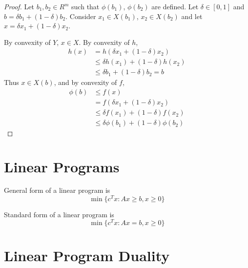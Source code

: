 \begin{proof}
  Let $b_{1}, b_{2} \in R^{m}$ such that $\phi(b_{1})$, $\phi(b_{2})$
  are defined.  Let $\delta \in [0, 1]$ and $b = \delta b_{1} + (1 -
  \delta) b_{2}$.  Consider $x_{1} \in X(b_{1})$, $x_{2} \in X(b_{2})$
  and let $x = \delta x_{1} + (1 - \delta) x_{2}$.

  By convexity of $Y$, $x \in X$.  By convexity of $h$,
  \begin{align*}
    h(x)    & = h(\delta x_{1} + (1-\delta) x_{2})         \\
            & \leq \delta h(x_{1}) + (1-\delta) h(x_{2})   \\
            & \leq \delta b_{1} + (1 - \delta) b_{2} = b
  \end{align*}
  Thus $x \in X(b)$, and by convexity of $f$,
  \begin{align*}
    \phi(b) & \leq f(x)                                    \\
            & = f(\delta x_{1} + (1 - \delta) x_{2})       \\
            & \leq \delta f(x_{1}) + (1 - \delta) f(x_{2}) \\
            & \leq \delta \phi(b_{1}) + (1 - \delta) \phi(b_{2})
  \end{align*}
\end{proof}

\section{Linear Programs}
\label{sec:linear-programs}

\begin{defn}
  \label{defn:linear_programming:3}
  General form of a linear program is
  \begin{equation}
    \label{exmp:linear_programming:1}
    \min\{c^{T} x : Ax \geq b, x \geq 0 \}
  \end{equation}

  Standard form of a linear program is
  \begin{equation}
    \label{exmp:linear_programming:3}
    \min\{c^{T}x : Ax = b, x \geq 0 \}
  \end{equation}
\end{defn}

\section{Linear Program Duality}
\label{sec:line-progr-dual}


